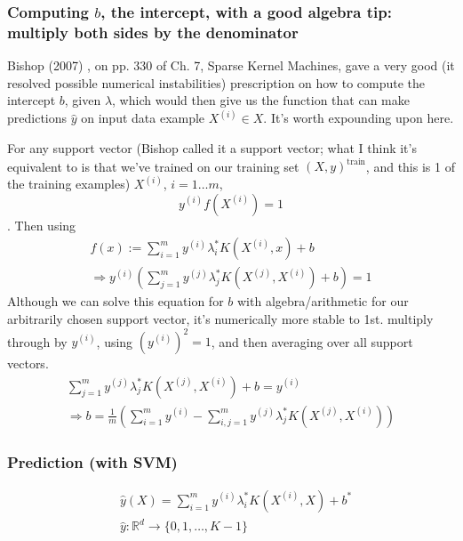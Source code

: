 \documentclass[10pt]{amsart}
\begin{document}
\begin{multicols*}{2}
\subsubsection{Computing $b$, the intercept, with a good algebra tip: multiply both sides by the denominator}

Bishop (2007) \cite{Bish2007}, on pp. 330 of Ch. 7, Sparse Kernel Machines,  gave a very good (it resolved possible numerical instabilities) prescription on how to compute the intercept $b$, given $\lambda$, which would then give us the function that can make predictions $\widehat{y}$ on input data example $X^{(i)} \in X$.  It's worth expounding upon here.  

For any support vector (Bishop called it a support vector; what I think it's equivalent to is that we've trained on our training set $(X,y)^{\text{train}}$, and this is 1 of the training examples) $X^{(i)}$, $i=1\dots m$,
\begin{equation}
  y^{(i)}f(X^{(i)}) =1
  \end{equation}.  Then using
\begin{equation}
\begin{gathered}
  f(x):=\sum_{i=1}^m y^{(i)} \lambda_i^* K(X^{(i)},x) + b \\
  \Longrightarrow y^{(i)} \left( \sum_{j=1}^m y^{(j)} \lambda_j^* K(X^{(j)},X^{(i)} ) + b \right) = 1
  \end{gathered}
  \end{equation}
Although we can solve this equation for $b$ with algebra/arithmetic for our arbitrarily chosen support vector, it's numerically more stable to 1st. multiply through by $y^{(i)}$, using $(y^{(i)})^2 =1$, and then averaging over all support vectors.
\begin{equation}
  \begin{gathered}
    \sum_{j=1}^m y^{(j)}\lambda_j^* K(X^{(j)},X^{(i)}) +b = y^{(i)} \\
    \Longrightarrow b= \frac{1}{m} \left( \sum_{i=1}^m y^{(i)} - \sum_{i,j=1}^m y^{(j)} \lambda_j^* K(X^{(j)}, X^{(i)}) \right)
    \end{gathered}
  \end{equation}

\subsubsection{Prediction (with SVM)}

\begin{equation}
  \begin{aligned}
    & \widehat{y}(X) = \sum_{i=1}^m y^{(i)} \lambda_i^* K(X^{(i)}, X) + b^* \\ 
    & \widehat{y}:\mathbb{R}^d \to \lbrace 0 ,1 , \dots , K-1 \rbrace
    \end{aligned}
  \end{equation}



\end{multicols*}
\end{document}
